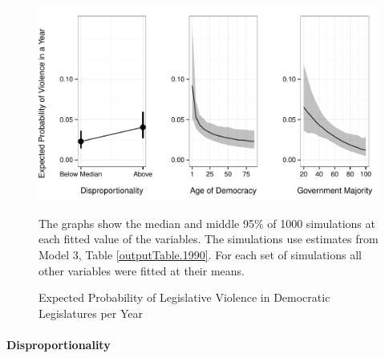 \documentclass[a4paper]{article}\usepackage[]{graphicx}\usepackage[]{color}
\newenvironment{knitrout}{}{} %
\begin{document}
\begin{figure}[t]
    \begin{center}

\begin{knitrout}
\color{fgcolor}
\includegraphics[width=0.95\linewidth]{figure/predProb-1} 

\end{knitrout}
    \end{center}
    \caption{Expected Probability of Legislative Violence in Democratic Legislatures per Year}
    \label{pred_prob}
    \begin{singlespace}
      {\scriptsize{The graphs show the median and middle 95\% of 1000 simulations at each fitted value of the variables. The simulations use estimates from Model 3, Table \ref{outputTable.1990}. For each set of simulations all other variables were fitted at their means.}}
    \end{singlespace}
\end{figure}

\paragraph{Disproportionality}
\end{document}
